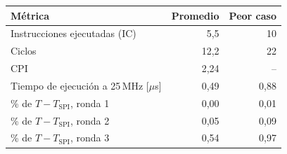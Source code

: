 \begin{tabular}{lrr}
\toprule
Métrica & Promedio & Peor caso \\
\midrule
Instrucciones ejecutadas (IC) & 5,5 & 10 \\
Ciclos & 12,2 & 22 \\
CPI & 2,24 & -- \\
Tiempo de ejecución a 25\,MHz [$\mu$s] & 0,49 & 0,88 \\
\% de $T-T_\text{SPI}$, ronda 1 & 0,00 & 0,01 \\
\% de $T-T_\text{SPI}$, ronda 2 & 0,05 & 0,09 \\
\% de $T-T_\text{SPI}$, ronda 3 & 0,54 & 0,97 \\
\bottomrule
\end{tabular}

